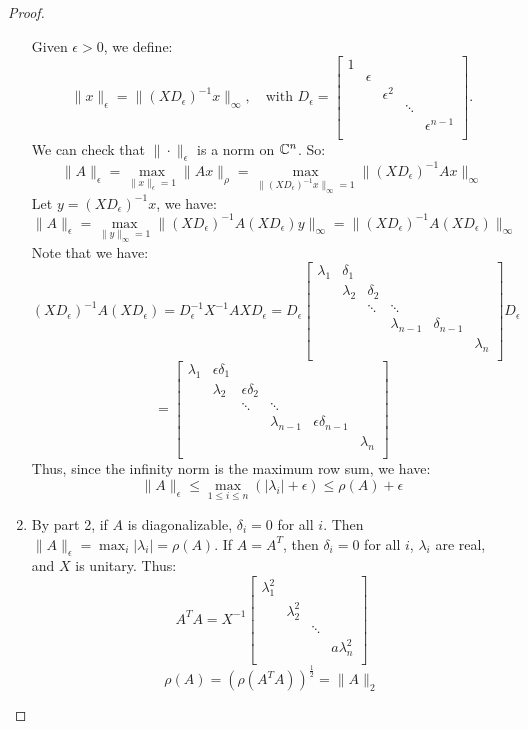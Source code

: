 \documentclass[../main/main.tex]{subfiles}
\begin{document}
\begin{proof}
\begin{enumerate}
          Given $\epsilon > 0$, we define: \[
          \|x\|_{\epsilon} = \|(X D_{\epsilon})^{-1} x\|_{\infty}, \quad \text{with }D_{\epsilon} = \begin{bmatrix}
1&&&& \\
&\epsilon&&& \\
&&\epsilon^2&& \\
&&&\ddots& \\
&&&&\epsilon^{n-1} \\
          \end{bmatrix}.
          \] We can check that $\|\cdot\|_{\epsilon}$ is a norm on $\mathbb{C}^{n}$. So: \[
\|A\|_{\epsilon} = \max_{\|x\|_{\epsilon}=1} \|Ax\|_{\rho} = \max_{\|(XD_{\epsilon})^{-1} x\|_{\infty}=1} \|(XD_{\epsilon})^{-1}Ax\|_{\infty}
          \]Let $y=(XD_{\epsilon})^{-1} x$, we have: \[
          \|A\|_{\epsilon} = \max_{\|y\|_{\infty}=1} \|(XD_{\epsilon})^{-1} A (XD_{\epsilon})y\|_{\infty} = \|(XD_{\epsilon})^{-1}A(XD_{\epsilon})\|_{\infty}
          \] Note that we have: \[
          (XD_{\epsilon})^{-1} A (XD_{\epsilon}) = D_{\epsilon}^{-1} X^{-1} A X D_{\epsilon} = D_{\epsilon} \begin{bmatrix}
      \lambda_{1}& \delta_{1}&&& &\\
      & \lambda_{2} & \delta_{2}&&& \\
      & & \ddots & \ddots &&\\
      & &  & \lambda_{n-1} &\delta_{n-1}&\\
      &&&&& \lambda_{n}  \\
          \end{bmatrix}D_{\epsilon}
          \] \[
          = \begin{bmatrix}
      \lambda_{1}&\epsilon \delta_{1}&&& &\\
      & \lambda_{2} &\epsilon \delta_{2}&&& \\
      & & \ddots & \ddots &&\\
      & &  & \lambda_{n-1} &\epsilon\delta_{n-1}&\\
      &&&&& \lambda_{n}  \\
          \end{bmatrix}
          \]
          Thus, since the infinity norm is the maximum row sum, we have: \[
          \|A\|_{\epsilon} \leq \max_{1\leq i\leq n} (|\lambda_{i}| +\epsilon) \leq \rho(A) +\epsilon
          \]
          \item By part 2, if $A$ is diagonalizable, $\delta_{i} = 0$ for all $i$. Then $\|A\|_{\epsilon} = \max_{i} |\lambda_{i}| = \rho(A)$.
          If $A = A^{T}$, then $\delta_{i} = 0$ for all $i$, $\lambda_{i}$ are real, and $X$ is unitary. Thus: \[
          A^{T}A = X^{-1} \begin{bmatrix}
\lambda_{1}^2&&& \\
&\lambda_{2}^2&& \\
&&\ddots& \\
&&&a\lambda_{n}^2 \\

          \end{bmatrix}
          \]
          \[
          \rho(A) = (\rho(A^{T}A))^{\frac{1}{2}} = \|A\|_{2}
          \]
  \end{enumerate}

\end{proof}
\end{document}
